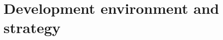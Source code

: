 \documentclass[draftmode,draftwater]{memarticle}
\begin{document}



\section{Development environment and strategy}


\end{document}
